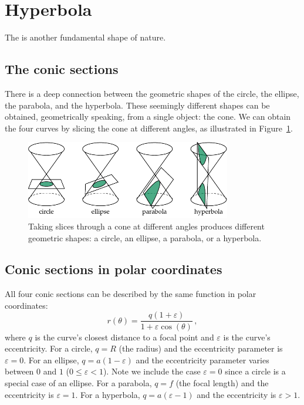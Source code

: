 
\section{Hyperbola}
\label{sec:hyperbola}

	The  is another fundamental shape of nature.
	

	\subsection{The conic sections}

		There is a deep connection between the geometric shapes of the circle,
		the ellipse, the parabola, and the hyperbola.
		These seemingly different shapes can be obtained, geometrically speaking,
		from a single object: the cone.															
		We can obtain the four curves by slicing the cone at different angles,
		as illustrated in Figure~\ref{fig:conic_sections_four-shapes}.

		\begin{figure}[htb]
			\centering
			\includegraphics[width=0.8\textwidth]{figures/math/conic_sections_four-shapes.pdf}
			\vspace{-2mm}
			\caption{	Taking slices through a cone at different angles produces different geometric shapes:
					a circle, an ellipse, a parabola, or a hyperbola.}
			\label{fig:conic_sections_four-shapes}
		\end{figure}
	

	\subsection{Conic sections in polar coordinates}

		All four conic sections can be described by the same function in polar coordinates:					
		\[
		  r(\theta) = \frac{q(1+\varepsilon)}{1 + \varepsilon\cos(\theta)}\,,
		\]
		where $q$ is the curve's closest distance to a focal point
		and $\varepsilon$ is the curve's eccentricity.												
		For a circle, $q=R$ (the radius) and the eccentricity parameter is $\varepsilon=0$.
		For an ellipse, $q=a(1-\varepsilon)$ and the eccentricity parameter varies between $0$ and $1$ ($0\leq \varepsilon < 1$).
		Note we include the case $\varepsilon=0$ since a circle is a special case of an ellipse.
		For a parabola, $q=f$ (the focal length) and the eccentricity is $\varepsilon=1$.
		For a hyperbola, $q = a(\varepsilon-1)$ and the eccentricity is $\varepsilon>1$.

